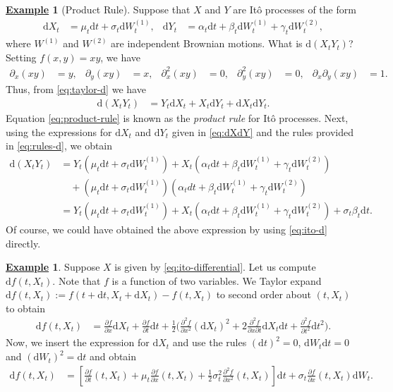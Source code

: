 \documentclass[12pt]{book}
\numberwithin{equation}{chapter}
\theoremstyle{plain}
\numberwithin{theorem}{section}
\theoremstyle{definition}
\newtheorem{example}[theorem]{\underline{Example}}
\numberwithin{exercise}{chapter}
\newcommand{\<}{\langle}
\renewcommand{\>}{\rangle}
\renewcommand{\(}{\left(}
\renewcommand{\)}{\right)}
\renewcommand{\[}{\left[}
\renewcommand{\]}{\right]}
\newcommand\sig{\sigma}
\newcommand\gam{\gamma}
\renewcommand\d{\partial}
\newcommand\dd{\mathrm{d}}
\theoremstyle{definition}
\numberwithin{question}{section}
\begin{document}
\begin{example}[Product Rule]
Suppose that $X$ and $Y$ are It\^o processes of the form
\begin{align}
\dd X_t
	&=	\mu_t \dd t + \sig_t \dd W_t^{(1)} , &
\dd Y_t
	&=	\alpha_t \dd t + \beta_t \dd W_t^{(1)} + \gam_t \dd W_t^{(2)} , \label{eq:dXdY}
\end{align}
where $W^{(1)}$ and $W^{(2)}$ are independent Brownian motions.
What is $\dd (X_t Y_t)$?  Setting $f(x,y) = xy$, we have
\begin{align}
{\d_x} (xy) &= y, &
{\d_y} (xy)&= x, &
{\d_x^2} (xy) &= 0 , &
{\d_y^2} (xy) &= 0, & 
{\d_x \d_y}(xy) &= 1 .
\end{align}
Thus, from \eqref{eq:taylor-d} we have
\begin{align}
\dd (X_t Y_t) 
	&=	Y_t \dd X_t + X_t \dd Y_t + \dd X_t \dd Y_t . \label{eq:product-rule}
\end{align}
Equation \eqref{eq:product-rule} is known as the \textit{product rule} for It\^o processes.
Next, using the expressions for $\dd X_t$ and $\dd Y_t$ given in \eqref{eq:dXdY} and the rules provided in \eqref{eq:rules-d}, we obtain
\begin{align}
\dd (X_t Y_t) 
	&=	Y_t (\mu_t \dd t + \sig_t \dd W_t^{(1)}) + X_t (\alpha_t \dd t + \beta_t \dd W_t^{(1)} + \gam_t \dd W_t^{(2)}) \\ & \quad
			+ (\mu_t \dd t + \sig_t \dd W_t^{(1)}) (\alpha_t dt + \beta_t \dd W_t^{(1)} + \gam_t \dd W_t^{(2)}) \\
	&=	Y_t (\mu_t \dd t + \sig_t \dd W_t^{(1)}) + X_t (\alpha_t \dd t + \beta_t \dd W_t^{(1)} + \gam_t \dd W_t^{(2)}) + \sig_t \beta_t \dd t .
\end{align}
Of course, we could have obtained the above expression by using \eqref{eq:ito-d} directly.
\end{example}

\begin{example}
Suppose $X$ is given by \eqref{eq:ito-differential}.  
Let us compute $\dd f(t,X_t)$.  Note that $f$ is a function of two variables.  We Taylor expand $\dd f(t,X_t) := f(t + \dd t, X_t + \dd X_t) - f(t,X_t)$ to second order about $(t,X_t)$ to obtain
\begin{align}
\dd f(t,X_t)
	&=	\frac{\d f}{\d x} \dd X_t + \frac{\d f}{\d t} \dd t 
			+ \frac{1}{2} \Big( \frac{\d^2 f}{\d x^2} (\dd X_t)^2 + 2 \frac{\d^2 f}{\d x \d t} \dd X_t \dd t + \frac{\d^2 f}{\d t^2} \dd t^2 \Big) .
\end{align}
Now, we insert the expression for $\dd X_t$ and use the rules $(\dd t)^2 = 0$, $\dd W_t \dd t = 0$ and $(\dd W_t)^2 = \dd t$ and obtain
\begin{align}
\dd f(t,X_t)
	&=	\[ \frac{\d f}{\d t}(t,X_t) + \mu_t \frac{\d f}{\d x}(t,X_t) + \frac{1}{2} \sigma_t^2 \frac{\d^2 f}{\d x^2}(t,X_t) \] \dd t
			+ \sig_t \frac{\d f}{\d x}(t,X_t)  \dd W_t.
\end{align}
\end{example}
\end{document}

